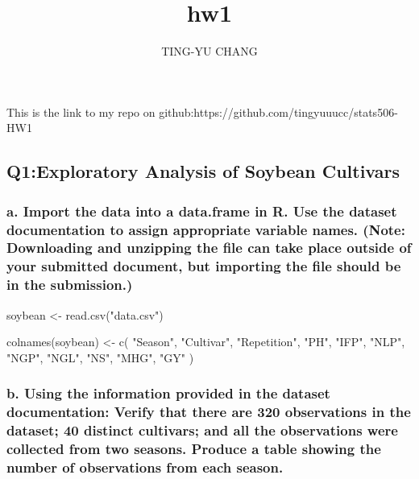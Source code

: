 \documentclass[
  letterpaper,
  DIV=11,
  numbers=noendperiod]{scrartcl}
\title{hw1}
\author{TING-YU CHANG}
\date{}
\newenvironment{Shaded}{\begin{snugshade}}{\end{snugshade}}
\newcommand{\FunctionTok}[1]{\textcolor[rgb]{0.28,0.35,0.67}{#1}}
\newcommand{\NormalTok}[1]{\textcolor[rgb]{0.00,0.23,0.31}{#1}}
\newcommand{\OtherTok}[1]{\textcolor[rgb]{0.00,0.23,0.31}{#1}}
\newcommand{\StringTok}[1]{\textcolor[rgb]{0.13,0.47,0.30}{#1}}
\begin{document}
\maketitle


This is the link to my repo on
github:https://github.com/tingyuuucc/stats506-HW1

\subsection{Q1:Exploratory Analysis of Soybean
Cultivars}\label{q1exploratory-analysis-of-soybean-cultivars}

\subsubsection{a. Import the data into a data.frame in R. Use the
dataset documentation to assign appropriate variable names. (Note:
Downloading and unzipping the file can take place outside of your
submitted document, but importing the file should be in the
submission.)}\label{a.-import-the-data-into-a-data.frame-in-r.-use-the-dataset-documentation-to-assign-appropriate-variable-names.-note-downloading-and-unzipping-the-file-can-take-place-outside-of-your-submitted-document-but-importing-the-file-should-be-in-the-submission.}

\begin{Shaded}
\begin{Highlighting}[]
\NormalTok{soybean }\OtherTok{\textless{}{-}} \FunctionTok{read.csv}\NormalTok{(}\StringTok{"data.csv"}\NormalTok{)}

\FunctionTok{colnames}\NormalTok{(soybean) }\OtherTok{\textless{}{-}} \FunctionTok{c}\NormalTok{(}
  \StringTok{"Season"}\NormalTok{,}
  \StringTok{"Cultivar"}\NormalTok{,}
  \StringTok{"Repetition"}\NormalTok{,}
  \StringTok{"PH"}\NormalTok{,}
  \StringTok{"IFP"}\NormalTok{,}
  \StringTok{"NLP"}\NormalTok{,}
  \StringTok{"NGP"}\NormalTok{,}
  \StringTok{"NGL"}\NormalTok{,}
  \StringTok{"NS"}\NormalTok{,}
  \StringTok{"MHG"}\NormalTok{,}
  \StringTok{"GY"}
\NormalTok{)}
\end{Highlighting}
\end{Shaded}

\subsubsection{b. Using the information provided in the dataset
documentation: Verify that there are 320 observations in the dataset; 40
distinct cultivars; and all the observations were collected from two
seasons. Produce a table showing the number of observations from each
season.}\label{b.-using-the-information-provided-in-the-dataset-documentation-verify-that-there-are-320-observations-in-the-dataset-40-distinct-cultivars-and-all-the-observations-were-collected-from-two-seasons.-produce-a-table-showing-the-number-of-observations-from-each-season.}
\end{document}
